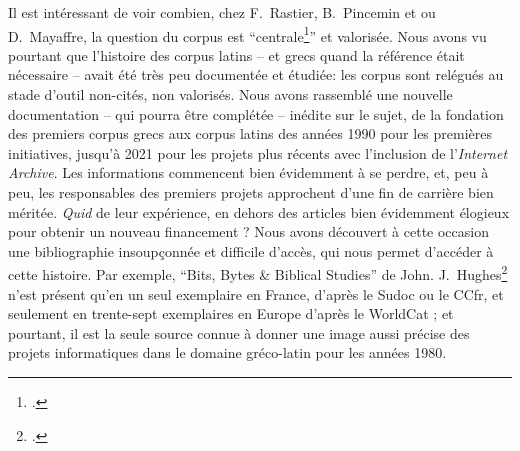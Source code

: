 Il est intéressant de voir combien, chez F.~Rastier, B.~Pincemin et ou D.~Mayaffre, la question du corpus est \enquote{centrale\footcite[p.~59]{mayaffre2008occurrence}} et valorisée. Nous avons vu pourtant que l'histoire des corpus latins -- et grecs quand la référence était nécessaire -- avait été très peu documentée et étudiée: les corpus sont relégués au stade d'outil non-cités, non valorisés. Nous avons rassemblé une nouvelle documentation -- qui pourra être complétée -- inédite sur le sujet, de la fondation des premiers corpus grecs aux corpus latins des années 1990 pour les premières initiatives, jusqu'à 2021 pour les projets plus récents avec l'inclusion de l'\textit{Internet Archive}. Les informations commencent bien évidemment à se perdre, et, peu à peu, les responsables des premiers projets approchent d'une fin de carrière bien méritée. \textit{Quid} de leur expérience, en dehors des articles bien évidemment élogieux pour obtenir un nouveau financement ? Nous avons découvert à cette occasion une bibliographie insoupçonnée et difficile d'accès, qui nous permet d'accéder à cette histoire. Par exemple, \enquote{Bits, Bytes \& Biblical Studies} de John. J.~Hughes\footcite{hughes_bits_1987} n'est présent qu'en un seul exemplaire en France, d'après le Sudoc ou le CCfr, et seulement en trente-sept exemplaires en Europe d'après le WorldCat ; et pourtant, il est la seule source connue à donner une image aussi précise des projets informatiques dans le domaine gréco-latin pour les années 1980.

